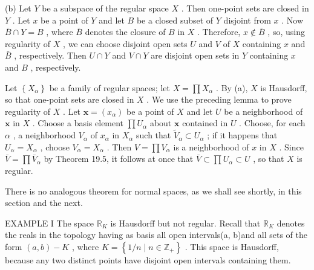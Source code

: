 (b) Let \(Y\) be a subspace of the regular space \(X\) . Then one-point sets are closed in \(Y\) . Let \(x\) be a point of \(Y\) and let \(B\) be a closed subset of \(Y\) disjoint from \(x\) . Now \(\bar{B} \cap  Y = B\) , where \(\bar{B}\) denotes the closure of \(B\) in \(X\) . Therefore, \(x \notin  \bar{B}\) , so, using regularity of \(X\) , we can choose disjoint open sets \(U\) and \(V\) of \(X\) containing \(x\) and \(\bar{B}\) , respectively. Then \(U \cap  Y\) and \(V \cap  Y\) are disjoint open sets in \(Y\) containing \(x\) and \(B\) , respectively.

Let \(\left\{  {X}_{\alpha }\right\}\) be a family of regular spaces; let \(X = \prod {X}_{\alpha }\) . By (a), \(X\) is Hausdorff, so that one-point sets are closed in \(X\) . We use the preceding lemma to prove regularity of \(X\) . Let \(\mathbf{x} = \left( {x}_{\alpha }\right)\) be a point of \(X\) and let \(U\) be a neighborhood of \(\mathbf{x}\) in \(X\) . Choose a basis element \(\prod {U}_{\alpha }\) about \(\mathbf{x}\) contained in \(U\) . Choose, for each \(\alpha\) , a neighborhood \({V}_{\alpha }\) of \({x}_{\alpha }\) in \({X}_{\alpha }\) such that \({\widetilde{V}}_{\alpha } \subset  {U}_{\alpha }\) ; if it happens that \({U}_{\alpha } = {X}_{\alpha }\) , choose \({V}_{\alpha } = {X}_{\alpha }\) . Then \(V = \prod {V}_{\alpha }\) is a neighborhood of \(x\) in \(X\) . Since \(\bar{V} = \prod {\bar{V}}_{\alpha }\) by Theorem 19.5, it follows at once that \(\bar{V} \subset  \prod {U}_{\alpha } \subset  U\) , so that \(X\) is regular.

There is no analogous theorem for normal spaces, as we shall see shortly, in this section and the next.

EXAMPLE I The space \({\mathbb{R}}_{K}\) is Hausdorff but not regular. Recall that \({\mathbb{R}}_{K}\) denotes the reals in the topology having as basis all open intervals(a, b)and all sets of the form \(\left( {a,b}\right)  - K\) , where \(K = \left\{  {1/n \mid  n \in  {\mathbb{Z}}_{ + }}\right\}\) . This space is Hausdorff, because any two distinct points have disjoint open intervals containing them.

